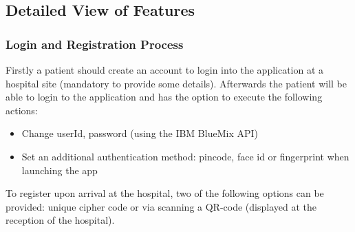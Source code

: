 \subsection{Detailed View of Features}
\subsubsection{Login and Registration Process}
Firstly a patient should create an account to login into the application at a hospital site (mandatory to provide some details). Afterwards the patient will be able to login to the application and has the option to execute the following actions:
\begin{itemize}
\item Change userId, password (using the IBM BlueMix API)
\item Set an additional authentication method: pincode, face id or fingerprint when launching the app
\end{itemize}
To register upon arrival at the hospital, two of the following options can be provided: unique cipher code or via scanning a QR-code (displayed at the reception of the hospital).
